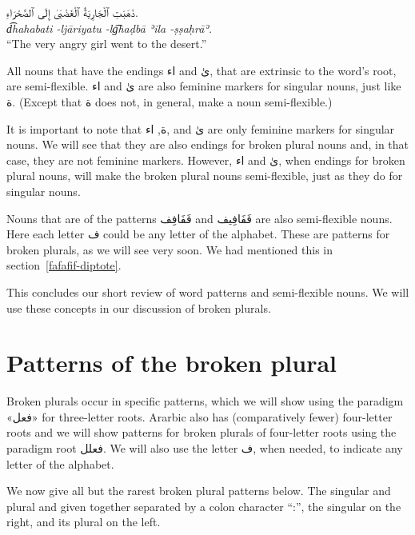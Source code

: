 \documentclass[
  10pt,
]{book}
\begin{document}
\foreignlanguage{arabic}{ذَهَبَتِ ٱلْجَارِيَةُ ٱلْغَضْبَىٰ إِلَى ٱلصَّحْرَاءِ.}\\
\emph{d͡hahabati -ljāriyatu -lg͡haḍbā ʾila -ṣṣaḥrāʾ.}\\
\enquote{The very angry girl went to the desert.}

All nouns that have the endings \foreignlanguage{arabic}{اء} and \foreignlanguage{arabic}{ىٰ}, that are extrinsic to the word's root, are semi-flexible.
\foreignlanguage{arabic}{اء} and \foreignlanguage{arabic}{ىٰ} are also feminine markers for singular nouns, just like \foreignlanguage{arabic}{ة}. (Except that \foreignlanguage{arabic}{ة} does not, in general, make a noun semi-flexible.)

It is important to note that \foreignlanguage{arabic}{ة}, \foreignlanguage{arabic}{اء}, and \foreignlanguage{arabic}{ىٰ} are only feminine markers for singular nouns. We will see that they are also endings for broken plural nouns and, in that case, they are not feminine markers. However,
\foreignlanguage{arabic}{اء} and \foreignlanguage{arabic}{ىٰ}, when endings for broken plural nouns, will make the broken plural nouns semi-flexible, just as they do for singular nouns.

Nouns that are of the patterns \foreignlanguage{arabic}{فَفَافِف} and \foreignlanguage{arabic}{فَفَافِيف} are also semi-flexible nouns. Here each letter \foreignlanguage{arabic}{ف} could be any letter of the alphabet.
These are patterns for broken plurals, as we will see very soon.
We had mentioned this in section~\ref{fafafif-diptote}.

This concludes our short review of word patterns and semi-flexible nouns. We will use these concepts in our discussion of broken plurals.

\section{Patterns of the broken plural}\label{patterns-of-the-broken-plural}

Broken plurals occur in specific patterns, which we will show using the paradigm \foreignlanguage{arabic}{«فعل»} for three-letter roots. Ararbic also has (comparatively fewer) four-letter roots and we will show patterns for broken plurals of four-letter roots using the paradigm root \foreignlanguage{arabic}{فعلل}. We will also use the letter \foreignlanguage{arabic}{ف}, when needed, to indicate any letter of the alphabet.

We now give all but the rarest broken plural patterns below. The singular and plural and given together separated by a colon character \enquote{:}, the singular on the right, and its plural on the left.
\end{document}
